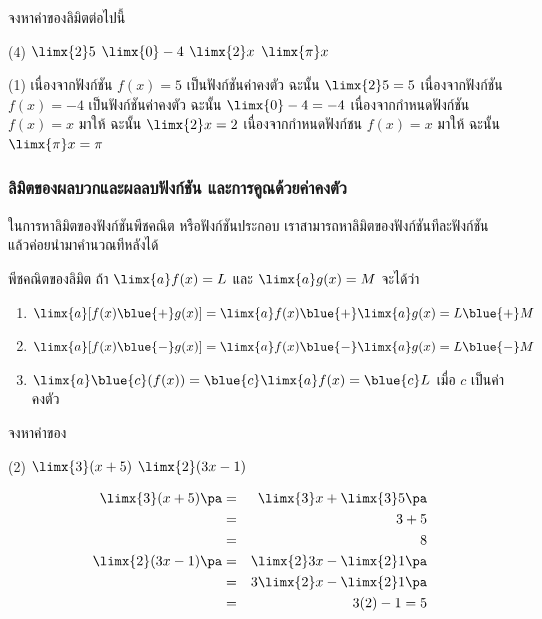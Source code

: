 \begin{frame}[t]
\begin{ex}
จงหาค่าของลิมิตต่อไปนี้
\begin{tasks}(4)
\task $\limx{2} 5 $
\task $\limx{0} -4 $
\task $\limx{2} x $
\task $\limx{\pi} x$ 
\end{tasks}
\end{ex}
\begin{sol}
\begin{tasks}(1)
\task เนื่องจากฟังก์ชัน $f(x) = 5$ เป็นฟังก์ชันค่าคงตัว \pa ฉะนั้น $\limx{2} 5 = 5$ \pa
\task เนื่องจากฟังก์ชัน $f(x) = -4$ เป็นฟังก์ชันค่าคงตัว \pa ฉะนั้น $\limx{0} -4 =  -4$ \pa
\task เนื่องจากกำหนดฟังก์ชัน $f(x) = x$ มาให้ ฉะนั้น $\limx{2} x = 2$ \pa
\task เนื่องจากกำหนดฟังก์ชน $f(x) = x$ มาให้ ฉะนั้น $\limx{\pi} x = \pi$ 
\end{tasks}
\end{sol}
\end{frame}

\begin{frame}
\frametitle{ลิมิตของผลบวกและผลลบฟังก์ชัน และการคูณด้วยค่าคงตัว}
ในการหาลิมิตของฟังก์ชันพีชคณิต หรือฟังก์ชันประกอบ เราสามารถหาลิมิตของฟังก์ชันทีละฟังก์ชัน แล้วค่อยนำมาคำนวณทีหลังได้
\begin{prop}{พีชคณิตของลิมิต}{}
ถ้า $\limx{a} f(x) = L$ และ $\limx{a} g(x) = M$ จะได้ว่า \pa
\begin{enumerate}
\item $\limx{a}[f(x) \blue{+} g(x)] = \limx{a} f(x) \blue{+} \limx{a} g(x) = L\blue{+}M$ \pa
\item $\limx{a} [f(x) \blue{-} g(x)] = \limx{a} f(x) \blue{-} \limx{a} g(x) = L \blue{-} M$ \pa
\item $\limx{a} \blue{c} (f(x)) = \blue{c} \limx{a} f(x) = \blue{c} L$ เมื่อ $c$ เป็นค่าคงตัว  \pa
\end{enumerate}
\end{prop}
\end{frame}


\begin{frame}[t]
\begin{ex}
จงหาค่าของ 
\begin{tasks}(2)
\task $\limx{3} (x+ 5)$
\task $\limx{2} (3x-1 )$
\end{tasks}
\end{ex}
\begin{sol}
\begin{eqnarray*}
\limx{3} (x+ 5) \pa &=& \limx{3} x + \limx{3} 5 \pa \\
&=& 3+5 \\
&=& 8 \\
\limx{2} (3x-1 ) \pa &=& \limx{2} 3x - \limx{2} 1 \pa \\
&=& 3\limx{2} x - \limx{2} 1 \pa \\
&=& 3(2) - 1 = 5
\end{eqnarray*}
\end{sol}
\end{frame}

